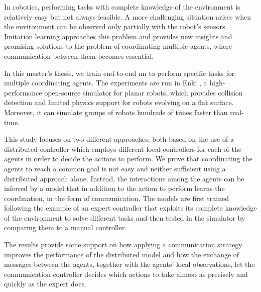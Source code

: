 In robotics, performing tasks with complete knowledge of the environment is 
relatively easy but not always feasible. A more challenging situation arises 
when the environment can be observed only partially with the robot's sensors. 
Imitation learning approaches this problem and provides new insights and 
promising solutions to the problem of coordinating multiple agents, where
communication between them becomes essential.

In this master's thesis, we train end-to-end \gls{nn} to perform specific 
tasks for multiple coordinating agents. The experiments are run in Enki 
\cite[see][]{enki}, a high-performance open-source simulator for planar robots, 
which provides collision detection and limited physics support for robots evolving 
on a flat surface. Moreover, it can simulate groups of robots hundreds of times 
faster than real-time.

This study focuses on two different approaches, both based on the use of a 
distributed controller which employs different local controllers for each of the 
agents in order to decide the actions to perform. 
We prove that coordinating the agents to reach a common goal is not easy and 
neither sufficient using a distributed approach alone. Instead, the interactions 
among the agents can be inferred by a model that in addition to the action to 
perform learns the coordination, in the form of communication. 
The models are first trained following the example of an expert controller that 
exploits its complete knowledge of the environment to solve different tasks and 
then tested in the simulator by comparing them to a manual controller.

The results provide some support on how applying a communication 
strategy improves the performance of the distributed model and how the 
exchange of messages between the agents, together with the agents' local 
observations, let the communication controller decides which actions to take 
almost as precisely and quickly as the expert does.
